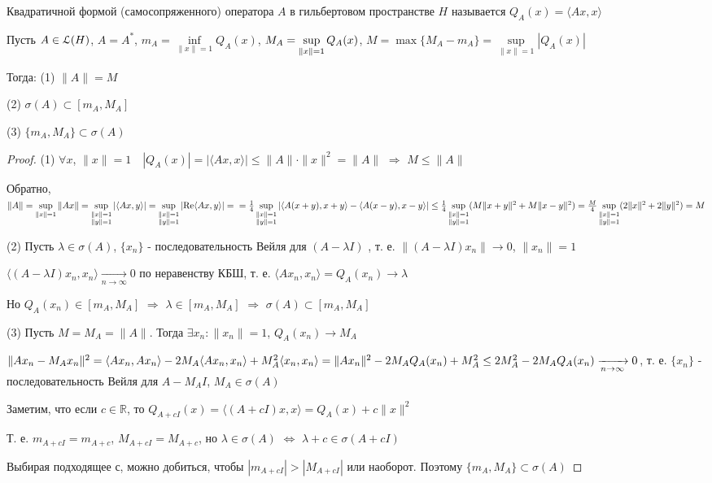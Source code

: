 \documentclass[a4paper,12pt]{report}
\newcommand*{\hm}[1]{#1\nobreak\discretionary{}%
            {\hbox{$\mathsurround=0pt #1$}}{}}
\begin{document}
\begin{df}
Квадратичной формой (самосопряженного) оператора $A$ в гильбертовом пространстве $H$ называется $Q_A(x)=\langle Ax,x\rangle$
\end{df}
 


\begin{thm}
Пусть $A\in\EuScript L(H)$, $A=A^*$, $m_A=\inf\limits_{\|x\|=1}Q_A(x)$, $M_A\hm=\sup\limits_{\|x\|=1}Q_A(x)$, $M=\max\{M_A-m_A\}=\sup\limits_{\|x\|=1}|Q_A(x)|$ 

Тогда: (1) $\|A\|=M$

(2) $\sigma(A)\subset[m_A,M_A]$

(3) $\{m_A,M_A\}\subset\sigma(A)$
\end{thm}
\begin{proof}
(1) $\forall x$, $\|x\|=1\quad|Q_A(x)|=|\langle Ax,x\rangle|\le\|A\|\cdot\|x\|^2=\|A\|$ $\Rightarrow$ $M\le\|A\|$

Обратно, $\|A\|=\sup\limits_{\|x\|=1}\|Ax\|=\sup\limits_{\substack{\|x\|=1\\ \|y\|=1}}|\langle Ax,y\rangle|=\sup\limits_{\substack{\|x\|=1\\ \|y\|=1}}|\mathrm{Re}\langle Ax,y\rangle|=\\ =\frac14\sup\limits_{\substack{\|x\|=1\\ \|y\|=1}}|\langle A(x+y),x+y\rangle-\langle A(x-y),x-y\rangle|\le\frac14\sup\limits_{\substack{\|x\|=1\\ \|y\|=1}}(M\|x+y\|^2+M\|x-y\|^2)\hm=\frac{M}4\sup\limits_{\substack{\|x\|=1\\ \|y\|=1}}(2\|x\|^2+2\|y\|^2)=M$

(2) Пусть $\lambda\in\sigma(A)$, $\{x_n\}$ - последовательность Вейля для $(A-\lambda I)$ , т. е. $\|(A-\lambda I)x_n\|\to0$, $\|x_n\|=1$

$\langle(A-\lambda I)x_n,x_n\rangle\xrightarrow[n\to\infty]{}0$ по неравенству КБШ, т. е. $\langle Ax_n,x_n\rangle={Q_A(x_n)\to\lambda}$

Но $Q_A(x_n)\in[m_A,M_A]$ $\Rightarrow$ $\lambda\in[m_A,M_A]$ $\Rightarrow$ $\sigma(A)\subset[m_A,M_A]$

(3) Пусть $M=M_A=\|A\|$. Тогда $\exists x_n\colon\|x_n\|=1$, $Q_A(x_n)\to M_A$

$\|A x_n-M_Ax_n\|^2=\langle Ax_n,Ax_n\rangle-2M_A\langle Ax_n,x_n\rangle+M_A^2\langle x_n,x_n\rangle=\|Ax_n\|^2\hm-2M_A Q_A(x_n)+M_A^2\le2M_A^2-2M_A Q_A(x_n)\xrightarrow[n\to\infty]{}0$, т. е. $\{x_n\}$ - последовательность Вейля для $A-M_A I$, $M_A\in\sigma(A)$

Заметим, что если $c\in\mathbb R$, то $Q_{A+cI}(x)=\langle(A+cI)x,x\rangle=Q_A(x)+c\|x\|^2$

Т. е. $m_{A+cI}=m_{A+c}$, $M_{A+cI}=M_{A+c}$, но $\lambda\in\sigma(A)$ $\Leftrightarrow$ $\lambda+c\in\sigma(A+cI)$

Выбирая подходящее $с$, можно добиться, чтобы $|m_{A+cI}|>|M_{A+cI}|$ или наоборот. Поэтому $\{m_A,M_A\}\subset\sigma(A)$
\end{proof}
 
\end{document}
